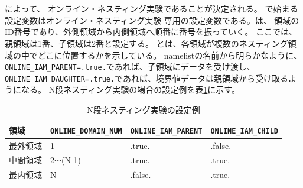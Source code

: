 \vspace{0.5cm}

\\
{\small {\gt
{}}}\\

\noindent 
{}によって、
オンライン・ネスティング実験であることが決定される。
で始まる設定変数はオンライン・ネスティング実験
専用の設定変数である。は、
領域のID番号であり、外側領域から内側領域へ順番に番号を振っていく。
ここでは、親領域は1番、子領域は2番と設定する。
とは、各領域が複数のネスティング領域の中でどこに位置するかを示している。
namelistの名前から明らかなように、
\verb|ONLINE_IAM_PARENT=.true.|であれば、子領域にデータを受け渡し、
\verb|ONLINE_IAM_DAUGHTER=.true.|であれば、境界値データは親領域から受け取るようになる。
N段ネスティング実験の場合の設定例を表\ref{tab:triple_nested}に示す。

\begin{table}[htb]
\begin{center}
\caption{N段ネスティング実験の設定例}
\begin{tabularx}{145mm}{|l|l|l|X|} \hline
 \rowcolor[gray]{0.9} 領域 & \verb|ONLINE_DOMAIN_NUM| & \verb|ONLINE_IAM_PARENT| & \verb|ONLINE_IAM_CHILD|\\ \hline
 最外領域 & 1               & .true.  & .false. \\ \hline
 中間領域 & 2\verb|〜|(N-1) & .true.  & .true. \\ \hline
 最内領域 & N               & .false. & .true. \\ \hline
\end{tabularx}
\label{tab:triple_nested}
\end{center}
\end{table}

